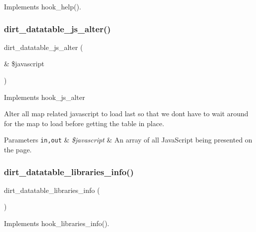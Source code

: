 Implements hook\+\_\+help(). \mbox{\label{dirt__datatable_8module_ac7ad0484e7993d45fd98e1b528c93eb6}} 
\subsubsection{\texorpdfstring{dirt\+\_\+datatable\+\_\+js\+\_\+alter()}{dirt\_datatable\_js\_alter()}}
{\footnotesize\ttfamily dirt\+\_\+datatable\+\_\+js\+\_\+alter (\begin{DoxyParamCaption}\item[{\&}]{\$javascript }\end{DoxyParamCaption})}

Implements hook\+\_\+js\+\_\+alter

Alter all map related javascript to load last so that we don\textquotesingle{}t have to wait around for the map to load before getting the table in place.


\begin{DoxyParams}[1]{Parameters}
\mbox{\tt in,out}  & {\em \$javascript} & An array of all Java\+Script being presented on the page. \\
\hline
\end{DoxyParams}
\mbox{\label{dirt__datatable_8module_a81361a75fe813ccab49a080e87b75c29}} 
\subsubsection{\texorpdfstring{dirt\+\_\+datatable\+\_\+libraries\+\_\+info()}{dirt\_datatable\_libraries\_info()}}
{\footnotesize\ttfamily dirt\+\_\+datatable\+\_\+libraries\+\_\+info (\begin{DoxyParamCaption}{ }\end{DoxyParamCaption})}

Implements hook\+\_\+libraries\+\_\+info().

